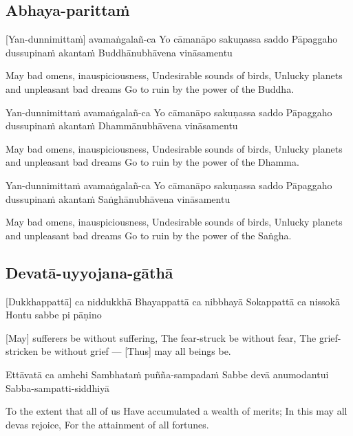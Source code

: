 \suttaRef{[Thai]}

\subsection{Abhaya-parittaṁ}
[Yan-dunnimittaṁ] avamaṅgalañ-ca
Yo cāmanāpo sakuṇassa saddo
Pāpaggaho dussupinaṁ akantaṁ
Buddhānubhāvena vināsamentu

\begin{english}
  May bad omens, inauspiciousness,
  Undesirable sounds of birds,
  Unlucky planets and unpleasant bad dreams
  Go to ruin by the power of the Buddha.
\end{english}

Yan-dunnimittaṁ avamaṅgalañ-ca
Yo cāmanāpo sakuṇassa saddo
Pāpaggaho dussupinaṁ akantaṁ
Dhammānubhāvena vināsamentu

\begin{english}
  May bad omens, inauspiciousness,
  Undesirable sounds of birds,
  Unlucky planets and unpleasant bad dreams
  Go to ruin by the power of the Dhamma.
\end{english}

Yan-dunnimittaṁ avamaṅgalañ-ca
Yo cāmanāpo sakuṇassa saddo
Pāpaggaho dussupinaṁ akantaṁ
Saṅghānubhāvena vināsamentu

\begin{english}
  May bad omens, inauspiciousness,
  Undesirable sounds of birds,
  Unlucky planets and unpleasant bad dreams
  Go to ruin by the power of the Saṅgha.
\end{english}

\suttaRef{[Trad]}

\subsection{Devatā-uyyojana-gāthā}
[Dukkhappattā] ca niddukkhā
Bhayappattā ca nibbhayā
Sokappattā ca nissokā
Hontu sabbe pi pāṇino

\begin{english}
  [May] sufferers be without suffering,
  The fear-struck be without fear,
  The grief-stricken be without grief —
  [Thus] may all beings be.
\end{english}

Ettāvatā ca amhehi
Sambhataṁ puñña-sampadaṁ
Sabbe devā anumodantui
Sabba-sampatti-siddhiyā

\begin{english}
  To the extent that all of us
  Have accumulated a wealth of merits;
  In this may all devas rejoice,
  For the attainment of all fortunes.
\end{english}


